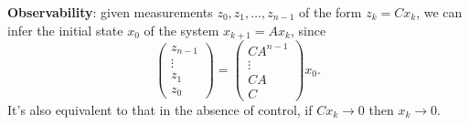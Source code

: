 \textbf{Observability}: given measurements $z_0,z_1,\dots,z_{n-1}$ of the form $z_k=C x_k$, we can infer the initial state $x_0$ of the system $x_{k+1}=Ax_k$, since 
\[\begin{pmatrix}
    z_{n - 1}\\
    \vdots\\
    z_1\\
    z_0
\end{pmatrix} = \begin{pmatrix}
    CA^{n-1}\\
    \vdots\\
    CA\\
    C
\end{pmatrix}x_0.\]
It's also equivalent to that in the absence of control, if $C x_k\rightarrow 0$ then $x_k\rightarrow 0$.

